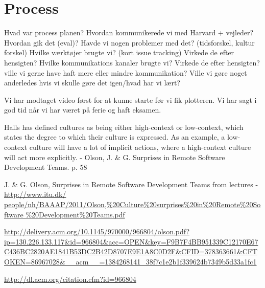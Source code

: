 
\section{Process}

Hvad var process planen?
Hvordan kommunikerede vi med Harvard + vejleder?
Hvordan gik det (eval)?
Havde vi nogen problemer med det? (tidsforskel, kultur forskel)
Hvilke værktøjer brugte vi? (kort issue tracking)
Virkede de efter hensigten?
Hvilke kommunikations kanaler brugte vi?
Virkede de efter hensigten? ville vi gerne have haft mere eller mindre kommunikation?
Ville vi gøre noget anderledes hvis vi skulle gøre det igen/hvad har vi lært?

Vi har modtaget video først for at kunne starte før vi fik plotteren.
Vi har sagt i god tid når vi har været på ferie og haft eksamen.

Halls has defined cultures as being either high-context or low-context, which states the degree to which their culture is expressed. As an example, a low-context culture will have a lot of implicit actions, where a high-context culture will act more explicitly.
- Olson, J. \& G. Surprises in Remote Software Development Teams. p. 58

J. \& G. Olson, Surprises in Remote Software Development Teams from lectures - \url{http://www.itu.dk/ people/nh/BAAAP/2011/Olson,%20Culture%20surprises%20in%20Remote%20Software %20Development%20Teams.pdf}

\url{http://delivery.acm.org/10.1145/970000/966804/olson.pdf?ip=130.226.133.117&id=966804&acc=OPEN&key=F9B7F4BB951339C12170E67C436BC2820AE1841B53DC2B42D8707E9E1A8C0D2F&CFID=378363661&CFTOKEN=86967028&__acm__=1384268141_38f7c1e2b1f339624b7349b5d33a1fc1}

\url{http://dl.acm.org/citation.cfm?id=966804}
